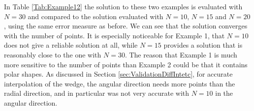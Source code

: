 In Table \ref{Tab:Example12} the solution to these two examples is evaluated with $N = 30$ and compared to the solution evaluated with $N = 10$, $N = 15$ and $N = 20$, using the same error measure as before. We can see that the solution converges with the number of points. It is especially noticeable for Example 1, that $N = 10$ does not give a reliable solution at all, while $N = 15$ provides a solution that is reasonably close to the one with $N = 30$. The reason that Example 1 is much more sensitive to the number of points than Example 2 could be that it contains polar shapes. As discussed in Section \ref{sec:ValidationDiffIntetc}, for accurate interpolation of the wedge, the angular direction needs more points than the radial direction, and in particular was not very accurate with $N = 10$ in the angular direction.







